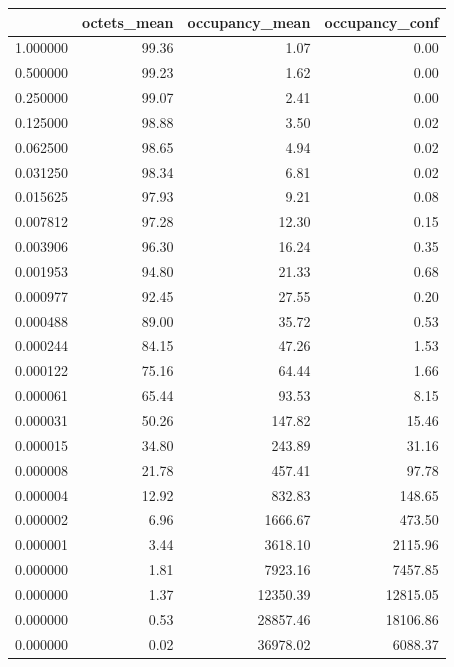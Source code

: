 \begin{tabular}{lrrr}
\toprule
 & octets_mean & occupancy_mean & occupancy_conf \\
\midrule
1.000000 & 99.36 & 1.07 & 0.00 \\
0.500000 & 99.23 & 1.62 & 0.00 \\
0.250000 & 99.07 & 2.41 & 0.00 \\
0.125000 & 98.88 & 3.50 & 0.02 \\
0.062500 & 98.65 & 4.94 & 0.02 \\
0.031250 & 98.34 & 6.81 & 0.02 \\
0.015625 & 97.93 & 9.21 & 0.08 \\
0.007812 & 97.28 & 12.30 & 0.15 \\
0.003906 & 96.30 & 16.24 & 0.35 \\
0.001953 & 94.80 & 21.33 & 0.68 \\
0.000977 & 92.45 & 27.55 & 0.20 \\
0.000488 & 89.00 & 35.72 & 0.53 \\
0.000244 & 84.15 & 47.26 & 1.53 \\
0.000122 & 75.16 & 64.44 & 1.66 \\
0.000061 & 65.44 & 93.53 & 8.15 \\
0.000031 & 50.26 & 147.82 & 15.46 \\
0.000015 & 34.80 & 243.89 & 31.16 \\
0.000008 & 21.78 & 457.41 & 97.78 \\
0.000004 & 12.92 & 832.83 & 148.65 \\
0.000002 & 6.96 & 1666.67 & 473.50 \\
0.000001 & 3.44 & 3618.10 & 2115.96 \\
0.000000 & 1.81 & 7923.16 & 7457.85 \\
0.000000 & 1.37 & 12350.39 & 12815.05 \\
0.000000 & 0.53 & 28857.46 & 18106.86 \\
0.000000 & 0.02 & 36978.02 & 6088.37 \\
\bottomrule
\end{tabular}

